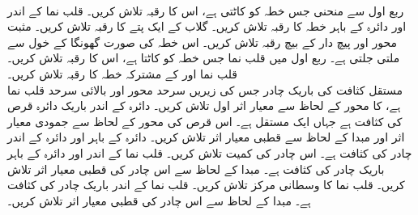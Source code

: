 \\
ربع اول سے منحنی  جس خطہ کو کاٹتی ہے، اس کا رقبہ تلاش کریں۔
قلب نما  کے اندر اور دائرہ  کے باہر خطہ کا رقبہ تلاش کریں۔
گلاب  کے ایک پتے  کا رقبہ تلاش کریں۔
\wf{\unexpanded{
$12\pi$
}}
مثبت محور  اور پیچ دار   کے بیچ رقبہ تلاش کریں۔ اس  خطہ کی صورت گھونگا  کے خول سے ملتی جلتی ہے۔  
ربع اول میں قلب نما  جس خطہ کو کاٹتا ہے، اس کا رقبہ تلاش کریں۔
قلب نما  اور  کے مشترکہ خطہ کا رقبہ تلاش کریں۔ 
\\
مستقل کثافت  کی باریک چادر جس کی زیریں سرحد محور  اور بالائی سرحد قلب نما  ہے، کا محور  کے لحاظ سے معیار اثر اول تلاش کریں۔
دائرہ  کے اندر باریک  دائرہ قرص  کی کثافت  ہے جہاں  ایک مستقل ہے۔ اس قرص  کی محور  کے لحاظ سے جمودی معیار اثر اور مبدا کے لحاظ سے قطبی معیار اثر تلاش کریں۔
دائرہ  کے باہر اور دائرہ  کے اندر  چادر کی کثافت  ہے۔ اس  چادر کی کمیت تلاش کریں۔
قلب نما  کے اندر اور دائرہ  کے باہر باریک چادر کی کثافت  ہے۔ مبدا کے لحاظ سے اس چادر کی قطبی معیار اثر تلاش کریں۔ 
قلب نما  کا وسطانی مرکز تلاش کریں۔
قلب نما  کے اندر باریک چادر کی کثافت  ہے۔ مبدا کے لحاظ سے اس چادر کی قطبی معیار اثر تلاش کریں۔

